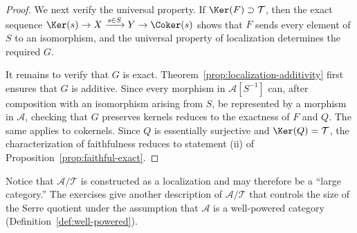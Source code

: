 \begin{proof}
We next verify the universal property. If
$\Ker(F)\supset\mathcal{T}$, then the exact sequence
$\Ker(s)\to X\xrightarrow{s\in S}Y\to\Coker(s)$ shows that $F$ sends every
element of $S$ to an isomorphism, and the universal property of localization
determines the required $G$.

It remains to verify that $G$ is exact.
Theorem~\ref{prop:localization-additivity} first ensures that $G$ is additive.
Since every morphism in $\mathcal{A}[S^{-1}]$ can, after composition with an
isomorphism arising from $S$, be represented by a morphism in $\mathcal{A}$,
checking that $G$ preserves kernels reduces to the exactness of $F$ and $Q$.
The same applies to cokernels. Since $Q$ is essentially surjective and
$\Ker(Q)=\mathcal{T}$, the characterization of faithfulness reduces to
statement (ii) of Proposition~\ref{prop:faithful-exact}.
\end{proof}
Notice that $\mathcal{A}/\mathcal{T}$ is constructed as a localization and may
therefore be a ``large category.'' The exercises give another description of
$\mathcal{A}/\mathcal{T}$ that controls the size of the Serre quotient under
the assumption that $\mathcal{A}$ is a well-powered category
(Definition~\ref{def:well-powered}).

